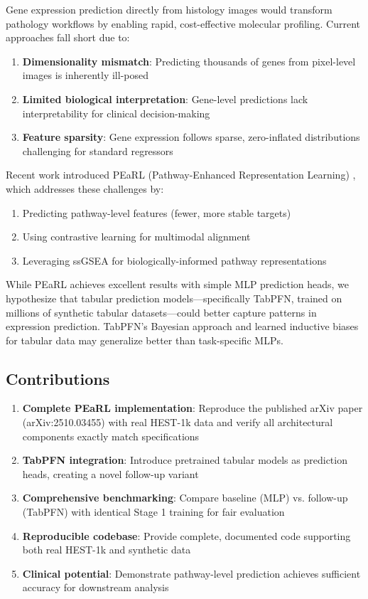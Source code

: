 \documentclass[conference]{IEEEtran}
\begin{document}
Gene expression prediction directly from histology images would transform pathology workflows by enabling rapid, cost-effective molecular profiling. Current approaches fall short due to:
\begin{enumerate}
\item \textbf{Dimensionality mismatch}: Predicting thousands of genes from pixel-level images is inherently ill-posed
\item \textbf{Limited biological interpretation}: Gene-level predictions lack interpretability for clinical decision-making
\item \textbf{Feature sparsity}: Gene expression follows sparse, zero-inflated distributions challenging for standard regressors
\end{enumerate}

Recent work introduced PEaRL (Pathway-Enhanced Representation Learning) \cite{pearl2025}, which addresses these challenges by:
\begin{enumerate}
\item Predicting pathway-level features (fewer, more stable targets)
\item Using contrastive learning for multimodal alignment
\item Leveraging ssGSEA for biologically-informed pathway representations
\end{enumerate}

While PEaRL achieves excellent results with simple MLP prediction heads, we hypothesize that tabular prediction models---specifically TabPFN, trained on millions of synthetic tabular datasets---could better capture patterns in expression prediction. TabPFN's Bayesian approach and learned inductive biases for tabular data may generalize better than task-specific MLPs.

\subsection{Contributions}
\begin{enumerate}
\item \textbf{Complete PEaRL implementation}: Reproduce the published arXiv paper (arXiv:2510.03455) with real HEST-1k data and verify all architectural components exactly match specifications
\item \textbf{TabPFN integration}: Introduce pretrained tabular models as prediction heads, creating a novel follow-up variant
\item \textbf{Comprehensive benchmarking}: Compare baseline (MLP) vs. follow-up (TabPFN) with identical Stage 1 training for fair evaluation
\item \textbf{Reproducible codebase}: Provide complete, documented code supporting both real HEST-1k and synthetic data
\item \textbf{Clinical potential}: Demonstrate pathway-level prediction achieves sufficient accuracy for downstream analysis
\end{enumerate}
\end{document}
